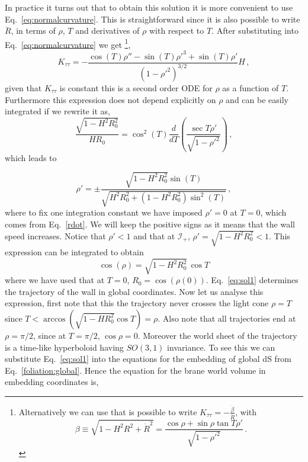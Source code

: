 \documentclass[a4paper,11pt]{article}
\numberwithin{equation}{section}
\begin{document}
In practice it turns out that to obtain this solution it is more convenient to use Eq.~\eqref{eq:normalcurvature}. This is straightforward since it  is also possible to write  $\ddot R$,  in terms of $\rho$, $T$ and derivatives of $\rho$ with respect to $T$.  After substituting into Eq.~\eqref{eq:normalcurvature} we get \footnote{Alternatively we can use that  is possible to write $K_{\tau\tau}=-\frac{\dot\beta}{\dot R}$, with $$\beta\equiv\sqrt{1-H^2R^2+\dot R^2}=\frac{\cos\rho+\sin\rho\tan T\rho'}{\sqrt{1-\rho'^2}}\,.$$},
\begin{equation}
K_{\tau\tau}=-\frac{\cos (T) \rho''-\sin (T)\rho'^3+\sin (T) \rho'}{\left(1-\rho'^2\right)^{3/2}}H \,,
\end{equation}
given that $K_{\tau\tau}$ is constant this is a   second order ODE for $\rho$ as a function of $T$. 
Furthermore this expression does not depend explicitly on $\rho$ and  can be easily integrated if we rewrite it as,
\begin{equation}
\frac{\sqrt{1-H ^2R_0^2}}{H R_0}=\cos^2 (T)\frac{d}{dT}\left(\frac{ \sec T \rho'}{\sqrt{1-\rho'^2}}\right) \,,
\end{equation}
which leads to

\begin{equation}
\rho'=\pm\frac{\sqrt{1-H^2R_0^2}\sin(T)}{\sqrt{H^2R_0^2+(1-H^2R_0^2)\sin ^2(T)}}\,,\label{eq:rho'}
\end{equation}
where to fix one integration constant we have imposed $\rho'=0$ at $T=0$, which comes from Eq.~\eqref{rdot}.
We will keep the positive signs as it means that the wall speed increases. Notice  that  $\rho'<1$ and that at $\mathscr{I}_+$, $\rho'=\sqrt{1-H^2R_0^2}<1$. This expression can be integrated to obtain
\begin{equation}
\boxed{\quad \cos(\rho)=\sqrt{1-H^2R_0^2}\, \cos T \quad} \label{eq:sol1}
\end{equation}
where we have used that at $T=0$, $R_0=\cos(\rho(0))$. Eq.~\eqref{eq:sol1} determines the trajectory of the wall in global coordinates. Now let us analyse this expression, first
note that this the trajectory never crosses the light cone $\rho=T$ since $T<\arccos(\sqrt{1-HR_0^2}\cos T)=\rho$.    Also note that   all trajectories end at $\rho=\pi/2$, since   at $T=\pi/2$, $\cos\rho=0$. Moreover the world sheet of the trajectory is a time-like  hyperboloid having $SO(3,1)$ invariance. To see this we can substitute Eq.~\eqref{eq:sol1} into the equations for the embedding of global dS from Eq.~\eqref{foliation:global}.
Hence the equation for the brane world volume in embedding coordinates is,
\end{document}
